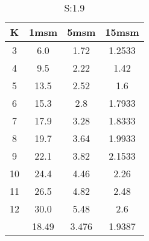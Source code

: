 \begin{table}[H]
\centering
\begin{tabular}{c|ccc}
K &1msm &5msm &15msm\\
\hline
3 & 6.0 & 1.72 & 1.2533\\
4 & 9.5 & 2.22 & 1.42\\
5 & 13.5 & 2.52 & 1.6\\
6 & 15.3 & 2.8 & 1.7933\\
7 & 17.9 & 3.28 & 1.8333\\
8 & 19.7 & 3.64 & 1.9933\\
9 & 22.1 & 3.82 & 2.1533\\
10 & 24.4 & 4.46 & 2.26\\
11 & 26.5 & 4.82 & 2.48\\
12 & 30.0 & 5.48 & 2.6\\
\hline
& 18.49 & 3.476 & 1.9387\\
\end{tabular}
\caption{S:1.9}
\label{tab:s1.9}
\end{table}
